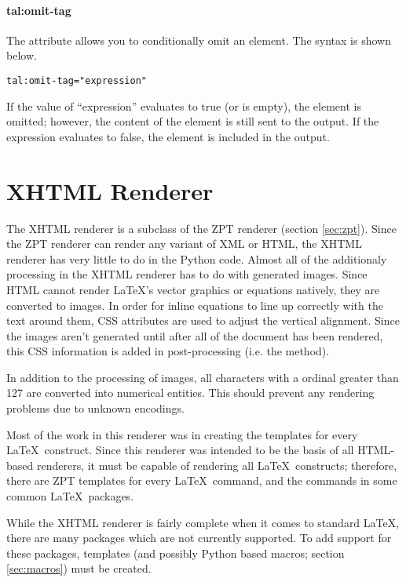 \paragraph{tal:omit-tag}

The  attribute allows you to conditionally omit an
element.  The syntax is shown below.
\begin{verbatim}
tal:omit-tag="expression"
\end{verbatim}

If the value of ``expression'' evaluates to true (or is empty), the element 
is omitted; however, the content of the element is still sent to the output.
If the expression evaluates to false, the element is included in the 
output.


\section{XHTML Renderer}

The XHTML renderer is a subclass of the ZPT renderer (section \ref{sec:zpt}).
Since the ZPT renderer can render any variant of XML or HTML, the 
XHTML renderer has very little to do in the Python code.  Almost all
of the additionaly processing in the XHTML renderer has to do with
generated images.  Since HTML cannot render \LaTeX's vector graphics
or equations natively, they are converted to images.  In order for 
inline equations to line up correctly with the text around them, CSS
attributes are used to adjust the vertical alignment.  Since the images
aren't generated until after all of the document has been rendered,
this CSS information is added in post-processing (i.e. the  
method).

In addition to the processing of images, all characters with a ordinal
greater than 127 are converted into numerical entities.  This should 
prevent any rendering problems due to unknown encodings.

Most of the work in this renderer was in creating the templates for 
every \LaTeX\ construct.  Since this renderer was intended to be the
basis of all HTML-based renderers, it must be capable of rendering
all \LaTeX\ constructs; therefore, there are ZPT templates for every
\LaTeX\ command, and the commands in some common \LaTeX\ packages.

While the XHTML renderer is fairly complete when it comes to standard
\LaTeX, there are many packages which are not currently supported.
To add support for these packages, templates (and possibly Python
based macros; section \ref{sec:macros}) must be created.


